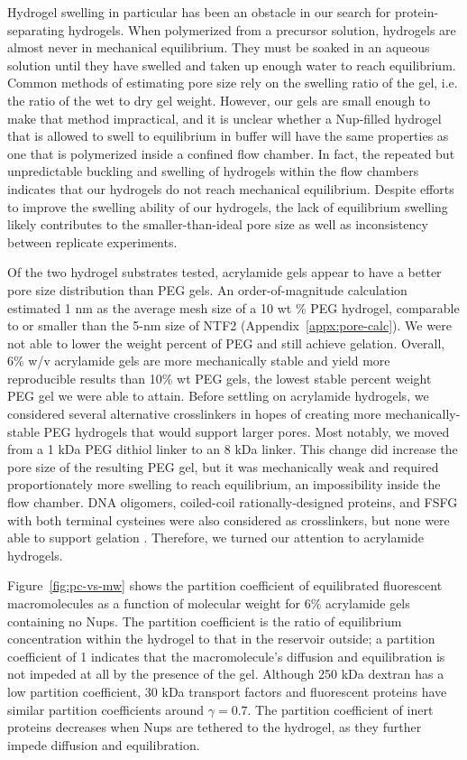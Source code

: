 Hydrogel swelling in particular has been an obstacle in our search for protein-separating hydrogels.  When polymerized from a precursor solution, hydrogels are almost never in mechanical equilibrium.  They must be soaked in an aqueous solution until they have swelled and taken up enough water to reach equilibrium.  Common methods of estimating pore size rely on the swelling ratio of the gel, i.e. the ratio of the wet to dry gel weight.  However, our gels are small enough to make that method impractical, and it is unclear whether a Nup-filled hydrogel that is allowed to swell to equilibrium in buffer will have the same properties as one that is polymerized inside a confined flow chamber.  In fact, the repeated but unpredictable buckling and swelling of hydrogels within the flow chambers indicates that our hydrogels do not reach mechanical equilibrium.  Despite efforts to improve the swelling ability of our hydrogels, the lack of equilibrium swelling likely contributes to the smaller-than-ideal pore size as well as inconsistency between replicate experiments.

Of the two hydrogel substrates tested, acrylamide gels appear to have a better pore size distribution than PEG gels.  An order-of-magnitude calculation estimated 1 nm as the average mesh size of a 10 wt \% PEG hydrogel, comparable to or smaller than the 5-nm size of NTF2 (Appendix~\ref{appx:pore-calc}).  We were not able to lower the weight percent of PEG and still achieve gelation.  Overall, 6\% w/v acrylamide gels are more mechanically stable and yield more reproducible results than 10\% wt  PEG gels, the lowest stable percent weight PEG gel we were able to attain. Before settling on acrylamide hydrogels, we considered several alternative crosslinkers in hopes of creating more mechanically-stable PEG hydrogels that would support larger pores.  Most notably, we moved from a 1 kDa PEG dithiol linker to an 8 kDa linker.  This change did increase the pore size of the resulting PEG gel, but it was mechanically weak and required proportionately more swelling to reach equilibrium, an impossibility inside the flow chamber.  DNA oligomers, coiled-coil rationally-designed proteins, and FSFG with both terminal cysteines were also considered as crosslinkers, but none were able to support gelation \cite{brunette15,huang14}.  Therefore, we turned our attention to acrylamide hydrogels.

Figure~\ref{fig:pc-vs-mw} shows the partition coefficient of equilibrated fluorescent macromolecules as a function of molecular weight for 6\% acrylamide gels containing no Nups.  The partition coefficient is the ratio of equilibrium concentration within the hydrogel to that in the reservoir outside; a partition coefficient of 1 indicates that the macromolecule's diffusion and equilibration is not impeded at all by the presence of the gel.  Although 250 kDa dextran has a low partition coefficient, 30 kDa transport factors and fluorescent proteins have similar partition coefficients around $\gamma = 0.7$.  The partition coefficient of inert proteins decreases when Nups are tethered to the hydrogel, as they further impede diffusion and equilibration.  

